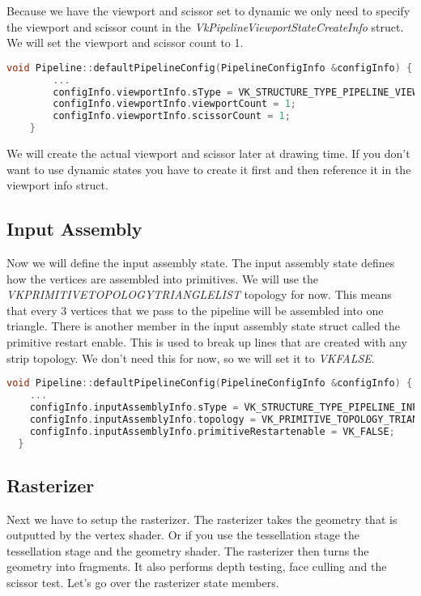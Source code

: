 \documentclass[12pt]{report} \usepackage{preamble}
\begin{document}
Because we have the viewport and scissor set to dynamic we only need to specify the viewport and scissor count in the
\textit{VkPipelineViewportStateCreateInfo} struct. We will set the viewport and scissor count to 1.

\begin{lstlisting}[language=C++]
void Pipeline::defaultPipelineConfig(PipelineConfigInfo &configInfo) {
		...
		configInfo.viewportInfo.sType = VK_STRUCTURE_TYPE_PIPELINE_VIEWPORT_STATE_CREATE_INFO;
		configInfo.viewportInfo.viewportCount = 1;
		configInfo.viewportInfo.scissorCount = 1;
	}
\end{lstlisting}

We will create the actual viewport and scissor later at drawing time.
If you don't want to use dynamic states you have to create it first and then reference it in the viewport info struct.

\subsection{Input Assembly}

Now we will define the input assembly state. The input assembly state defines how the vertices are assembled into primitives.
We will use the \\ \textit{VK\textunderscore PRIMITIVE\textunderscore TOPOLOGY\textunderscore TRIANGLE\textunderscore LIST} topology
for now. This means that every 3 vertices that we pass to the pipeline will be assembled into one triangle. There is another
member in the input assembly state struct called the primitive restart enable. This is used to break up lines that are
created with any strip topology. We don't need this for now, so we will set it to \textit{VK\textunderscore FALSE}.

\begin{lstlisting}[language=C++]
void Pipeline::defaultPipelineConfig(PipelineConfigInfo &configInfo) {
    ...
    configInfo.inputAssemblyInfo.sType = VK_STRUCTURE_TYPE_PIPELINE_INPUT_ASSEMBLY_STATE_CREATE_INFO;
    configInfo.inputAssemblyInfo.topology = VK_PRIMITIVE_TOPOLOGY_TRIANGLE_LIST;
    configInfo.inputAssemblyInfo.primitiveRestartenable = VK_FALSE;
  }
\end{lstlisting}

\subsection{Rasterizer}

Next we have to setup the rasterizer. The rasterizer takes the geometry that is outputted by the vertex shader.
Or if you use the tessellation stage the tessellation stage and the geometry shader. The rasterizer then turns the geometry
into fragments. It also performs depth testing, face culling and the scissor test. Let's go over the rasterizer state members.
\end{document}
